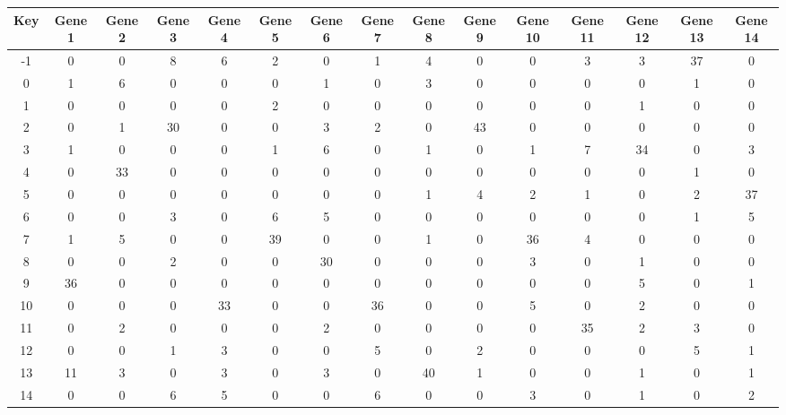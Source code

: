 \begin{tabular}{|c|c|c|c|c|c|c|c|c|c|c|c|c|c|c|}
\hline
Key & Gene 1 & Gene 2 & Gene 3 & Gene 4 & Gene 5 & Gene 6 & Gene 7 & Gene 8 & Gene 9 & Gene 10 & Gene 11 & Gene 12 & Gene 13 & Gene 14 \\
\hline
-1 & 0 & 0 & 8 & 6 & 2 & 0 & 1 & 4 & 0 & 0 & 3 & 3 & 37 & 0 \\
0 & 1 & 6 & 0 & 0 & 0 & 1 & 0 & 3 & 0 & 0 & 0 & 0 & 1 & 0 \\
1 & 0 & 0 & 0 & 0 & 2 & 0 & 0 & 0 & 0 & 0 & 0 & 1 & 0 & 0 \\
2 & 0 & 1 & 30 & 0 & 0 & 3 & 2 & 0 & 43 & 0 & 0 & 0 & 0 & 0 \\
3 & 1 & 0 & 0 & 0 & 1 & 6 & 0 & 1 & 0 & 1 & 7 & 34 & 0 & 3 \\
4 & 0 & 33 & 0 & 0 & 0 & 0 & 0 & 0 & 0 & 0 & 0 & 0 & 1 & 0 \\
5 & 0 & 0 & 0 & 0 & 0 & 0 & 0 & 1 & 4 & 2 & 1 & 0 & 2 & 37 \\
6 & 0 & 0 & 3 & 0 & 6 & 5 & 0 & 0 & 0 & 0 & 0 & 0 & 1 & 5 \\
7 & 1 & 5 & 0 & 0 & 39 & 0 & 0 & 1 & 0 & 36 & 4 & 0 & 0 & 0 \\
8 & 0 & 0 & 2 & 0 & 0 & 30 & 0 & 0 & 0 & 3 & 0 & 1 & 0 & 0 \\
9 & 36 & 0 & 0 & 0 & 0 & 0 & 0 & 0 & 0 & 0 & 0 & 5 & 0 & 1 \\
10 & 0 & 0 & 0 & 33 & 0 & 0 & 36 & 0 & 0 & 5 & 0 & 2 & 0 & 0 \\
11 & 0 & 2 & 0 & 0 & 0 & 2 & 0 & 0 & 0 & 0 & 35 & 2 & 3 & 0 \\
12 & 0 & 0 & 1 & 3 & 0 & 0 & 5 & 0 & 2 & 0 & 0 & 0 & 5 & 1 \\
13 & 11 & 3 & 0 & 3 & 0 & 3 & 0 & 40 & 1 & 0 & 0 & 1 & 0 & 1 \\
14 & 0 & 0 & 6 & 5 & 0 & 0 & 6 & 0 & 0 & 3 & 0 & 1 & 0 & 2 \\
\hline
\end{tabular}
